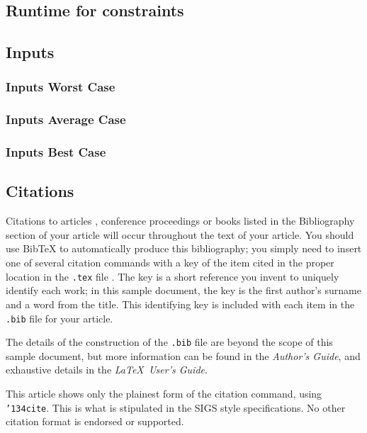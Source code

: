 \documentclass{sig-alternate}
\begin{document}
\subsection{Runtime for constraints}

\subsection{Inputs} 

\subsubsection{Inputs Worst Case}
\subsubsection{Inputs Average Case}
\subsubsection{Inputs Best Case}

 
\subsection{Citations}
Citations to articles \cite{bowman:reasoning,
clark:pct, braams:babel, herlihy:methodology},
conference proceedings \cite{clark:pct} or
books \cite{salas:calculus, Lamport:LaTeX} listed
in the Bibliography section of your
article will occur throughout the text of your article.
You should use BibTeX to automatically produce this bibliography;
you simply need to insert one of several citation commands with
a key of the item cited in the proper location in
the \texttt{.tex} file \cite{Lamport:LaTeX}.
The key is a short reference you invent to uniquely
identify each work; in this sample document, the key is
the first author's surname and a
word from the title.  This identifying key is included
with each item in the \texttt{.bib} file for your article.

The details of the construction of the \texttt{.bib} file
are beyond the scope of this sample document, but more
information can be found in the \textit{Author's Guide},
and exhaustive details in the \textit{\LaTeX\ User's
Guide}\cite{Lamport:LaTeX}.

This article shows only the plainest form
of the citation command, using \texttt{{\char'134}cite}.
This is what is stipulated in the SIGS style specifications.
No other citation format is endorsed or supported.
\end{document}
